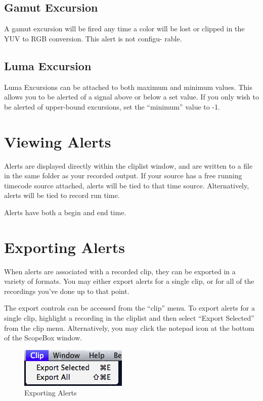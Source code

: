 \documentclass[10,letterpaper,]{report}
\begin{document}
\subsection{Gamut Excursion}

A gamut excursion will be fired any time a color will be lost or clipped
in the YUV to RGB conversion. This alert is not configu- rable.

\subsection{Luma Excursion}

Luma Excursions can be attached to both maximum and minimum values. This
allows you to be alerted of a signal above or below a set value. If you
only wish to be alerted of upper-bound excursions, set the ``minimum''
value to -1.

\section{Viewing Alerts}

Alerts are displayed directly within the cliplist window, and are
written to a file in the same folder as your recorded output. If your
source has a free running timecode source attached, alerts will be tied
to that time source. Alternatively, alerts will be tied to record run
time.

Alerts have both a begin and end time.

\section{Exporting Alerts}

When alerts are associated with a recorded clip, they can be exported in
a variety of formats. You may either export alerts for a single clip, or
for all of the recordings you've done up to that point.

The export controls can be accessed from the ``clip'' menu. To export
alerts for a single clip, highlight a recording in the cliplist and then
select ``Export Selected'' from the clip menu. Alternatively, you may
click the notepad icon at the bottom of the ScopeBox window.

\begin{figure}[htbp]
\centering
\includegraphics{images/clipMenu.png}
\caption{Exporting Alerts}
\end{figure}
\end{document}

